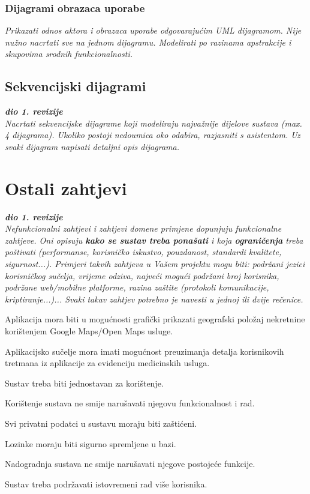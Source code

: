 					
				\subsubsection{Dijagrami obrazaca uporabe}
					
					\textit{Prikazati odnos aktora i obrazaca uporabe odgovarajućim UML dijagramom. Nije nužno nacrtati sve na jednom dijagramu. Modelirati po razinama apstrakcije i skupovima srodnih funkcionalnosti.}
				\eject		
				
			\subsection{Sekvencijski dijagrami}
				
				\textbf{\textit{dio 1. revizije}}\\
				
				\textit{Nacrtati sekvencijske dijagrame koji modeliraju najvažnije dijelove sustava (max. 4 dijagrama). Ukoliko postoji nedoumica oko odabira, razjasniti s asistentom. Uz svaki dijagram napisati detaljni opis dijagrama.}
				\eject
	
		\section{Ostali zahtjevi}
		
			\textbf{\textit{dio 1. revizije}}\\
		 
			 \textit{Nefunkcionalni zahtjevi i zahtjevi domene primjene dopunjuju funkcionalne zahtjeve. Oni opisuju \textbf{kako se sustav treba ponašati} i koja \textbf{ograničenja} treba poštivati (performanse, korisničko iskustvo, pouzdanost, standardi kvalitete, sigurnost...). Primjeri takvih zahtjeva u Vašem projektu mogu biti: podržani jezici korisničkog sučelja, vrijeme odziva, najveći mogući podržani broj korisnika, podržane web/mobilne platforme, razina zaštite (protokoli komunikacije, kriptiranje...)... Svaki takav zahtjev potrebno je navesti u jednoj ili dvije rečenice.}
			 \begin{packed_item}
                \item Aplikacija mora biti u mogućnosti grafički prikazati geografski položaj nekretnine korištenjem Google Maps/Open Maps usluge.
                \item Aplikacijsko sučelje mora imati mogućnost preuzimanja detalja korisnikovih tretmana iz aplikacije za evidenciju medicinskih usluga.
                \item Sustav treba biti jednostavan za korištenje.
                \item Korištenje sustava ne smije narušavati njegovu funkcionalnost i rad.
                \item Svi privatni podatci u sustavu moraju biti zaštićeni.
                \item Lozinke moraju biti sigurno spremljene u bazi.
                \item Nadogradnja sustava ne smije narušavati njegove postojeće funkcije.
                \item Sustav treba podržavati istovremeni rad više korisnika.
		  	\end{packed_item}
			 
			 
	